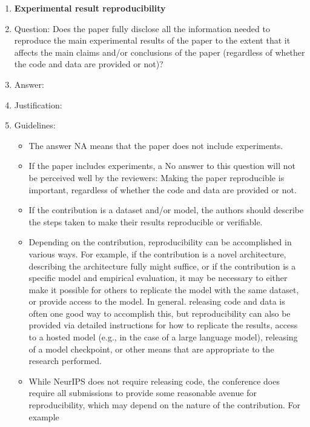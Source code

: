 \begin{enumerate}
  \item {\bf Experimental result reproducibility}
  \item[] Question: Does the paper fully disclose all the information needed to reproduce the main experimental results of the paper to the extent that it affects the main claims and/or conclusions of the paper (regardless of whether the code and data are provided or not)?
  \item[] Answer: \answerTODO{} %
  \item[] Justification: \justificationTODO{}
  \item[] Guidelines:
        \begin{itemize}
          \item The answer NA means that the paper does not include experiments.
          \item If the paper includes experiments, a No answer to this question will not be perceived well
                by the reviewers: Making the paper reproducible is important, regardless of whether the
                code and data are provided or not.
          \item If the contribution is a dataset and/or model, the authors should describe the steps taken
                to make their results reproducible or verifiable.
          \item Depending on the contribution, reproducibility can be accomplished in various ways. For
                example, if the contribution is a novel architecture, describing the architecture fully
                might suffice, or if the contribution is a specific model and empirical evaluation, it may
                be necessary to either make it possible for others to replicate the model with the same
                dataset, or provide access to the model. In general. releasing code and data is often one
                good way to accomplish this, but reproducibility can also be provided via detailed
                instructions for how to replicate the results, access to a hosted model (e.g., in the case
                of a large language model), releasing of a model checkpoint, or other means that are
                appropriate to the research performed.
          \item While NeurIPS does not require releasing code, the conference does require all submissions
                to provide some reasonable avenue for reproducibility, which may depend on the nature of
                the contribution. For example

\end{itemize}
\end{enumerate}
